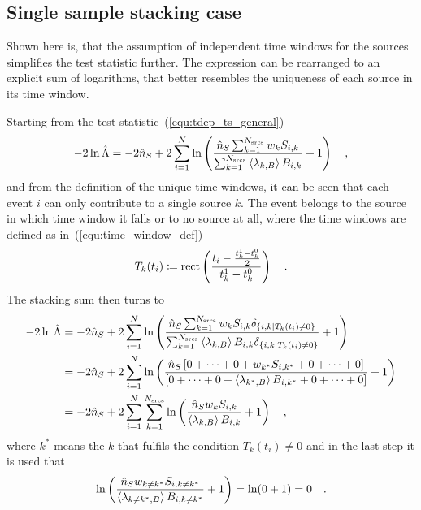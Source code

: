 \subsection{Single sample stacking case}
  \label{chp:pointsource_tdep_llh_single}
Shown here is, that the assumption of independent time windows for the sources simplifies the test statistic further.
The expression can be rearranged to an explicit sum of logarithms, that better resembles the uniqueness of each source in its time window.

Starting from the test statistic~(\ref{equ:tdep_ts_general})
\begin{equation}
  -2\ln\hat{\Lambda}
  = -2\hat{n}_S +
      2\sum_{i=1}^N \ln\left(
        \frac{\hat{n}_S \sum_{k=1}^{N_\text{srcs}} w_k S_{i,k}}
             {\sum_{k=1}^{N_\text{srcs}}\Braket{\lambda_{k,B}} B_{i,k}}
        + 1
      \right)
  \quad\text{,}
\end{equation}
and from the definition of the unique time windows, it can be seen that each event $i$ can only contribute to a single source $k$.
The event belongs to the source in which time window it falls or to no source at all, where the time windows are defined as in~(\ref{equ:time_window_def})
\begin{equation}
  T_k(t_i) \coloneqq \operatorname{rect} \left(
    \frac{t_i - \frac{t_k^1-t_k^0}{2}} {t_k^1-t_k^0}
  \right)
  \quad\text{.}
\end{equation}
The stacking sum then turns to
\begin{align}
  -2\ln\hat{\Lambda}
  &= -2\hat{n}_S +
      2\sum_{i=1}^N \ln\left(
        \frac{\hat{n}_S \sum_{k=1}^{N_\text{srcs}} w_k S_{i,k}
              \delta_{\{i,k|T_k(t_i)\neq 0\}}}
             {\sum_{k=1}^{N_\text{srcs}}\Braket{\lambda_{k,B}} B_{i,k}
              \delta_{\{i,k|T_k(t_i)\neq 0\}}}
        + 1
      \right) \\
  &= -2\hat{n}_S +
      2\sum_{i=1}^N \ln\left(
        \frac{\hat{n}_S \left[0+\dots+0+ w_{k^*} S_{i,k^*} +0+\dots+0\right]}
             {\left[
              0+\dots+0+ \Braket{\lambda_{k^*,B}} B_{i,k^*} +0+\dots+0
              \right]}
        + 1
      \right) \\
  &= -2\hat{n}_S +
      2\sum_{i=1}^N \sum_{k=1}^{N_\text{srcs}} \ln\left(
        \frac{\hat{n}_S w_k S_{i,k}}{\Braket{\lambda_{k,B}} B_{i,k}}
        + 1
      \right)
  \quad\text{,}
\end{align}
where $k^*$ means the $k$ that fulfils the condition $T_k(t_i)\neq 0$ and in the last step it is used that
\begin{equation}
  \ln\left(
      \frac{\hat{n}_S w_{k\neq k^*} S_{i,k\neq k^*}}
           {\Braket{\lambda_{k\neq k^*,B}} B_{i,k\neq k^*}}
      + 1
    \right)
    = \ln(0 + 1) = 0
  \quad\text{.}
\end{equation}

